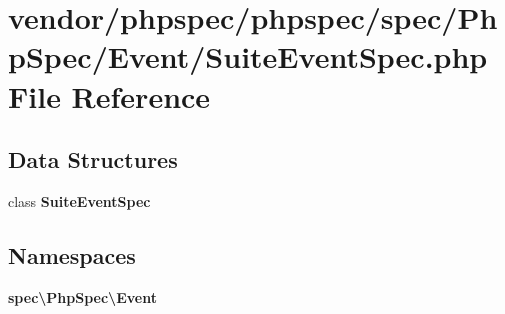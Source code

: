 \section{vendor/phpspec/phpspec/spec/\+Php\+Spec/\+Event/\+Suite\+Event\+Spec.php File Reference}
\label{_suite_event_spec_8php}
\subsection*{Data Structures}
\begin{DoxyCompactItemize}
\item 
class {\bf Suite\+Event\+Spec}
\end{DoxyCompactItemize}
\subsection*{Namespaces}
\begin{DoxyCompactItemize}
\item 
 {\bf spec\textbackslash{}\+Php\+Spec\textbackslash{}\+Event}
\end{DoxyCompactItemize}
